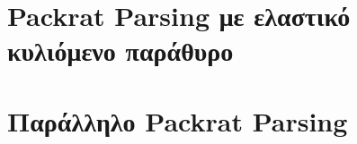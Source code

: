 \documentclass{beamer}
\begin{document}
\begin{frame}
  \frametitle{}
\end{frame}

\begin{frame}
  \frametitle{}
\end{frame}

\section{Packrat Parsing με ελαστικό κυλιόμενο παράθυρο}

\begin{frame}
  \frametitle{}
\end{frame}

\begin{frame}
  \frametitle{}
\end{frame}

\begin{frame}
  \frametitle{}
\end{frame}

\begin{frame}
  \frametitle{}
\end{frame}

\begin{frame}
  \frametitle{}
\end{frame}

\section{Παράλληλο Packrat Parsing}

\begin{frame}
  \frametitle{}
\end{frame}

\begin{frame}
  \frametitle{}
\end{frame}

\begin{frame}
  \frametitle{}
\end{frame}

\begin{frame}
  \frametitle{}
\end{frame}

\begin{frame}
  \frametitle{}
\end{frame}

\begin{frame}
  \frametitle{}
\end{frame}
\end{document}
